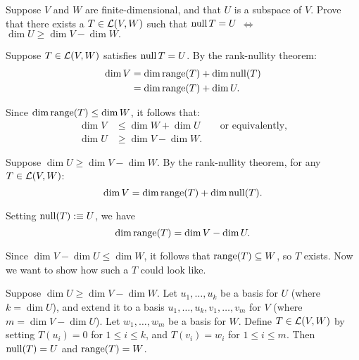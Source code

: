 \begin{xrcs}
  Suppose $V$ and $W$ are finite-dimensional, and that $U$ is a subspace of $V$. Prove that there exists a $T \in \mathcal{L}(V,W)$ such that $\operatorname{null} T = U$
  $\iff$ $\dim U \geq \dim V - \dim W.$
\end{xrcs}
\begin{prf}
  \Rightarrowdirection Suppose $T \in \mathcal{L}(V,W)$ satisfies $\operatorname{null} T = U$. By the rank-nullity theorem:
  \begin{equation}
    \begin{aligned}
      \dim V &= \dim \operatorname{range}(T) + \dim \operatorname{null}(T) \\
             &= \dim \operatorname{range}(T) + \dim U.
    \end{aligned}
  \end{equation}

  Since $\dim \operatorname{range}(T) \leq \dim W$, it follows that:
  \begin{equation}
    \begin{aligned}
      \dim V &\leq \dim W + \dim U \qquad \text{or equivalently,}  \\
      \dim U &\geq \dim V - \dim W.
    \end{aligned}
  \end{equation}

  \Leftarrowdirection Suppose $\dim U \geq \dim V - \dim W$. By the rank-nullity theorem, for any $T \in \mathcal{L}(V,W)$:
  \begin{equation}
    \dim V = \dim \operatorname{range}(T) + \dim \operatorname{null}(T).
  \end{equation}

  Setting $\operatorname{null}(T) :\equiv U$, we have
  \begin{equation}
    \dim \operatorname{range}(T) = \dim V - \dim U.
  \end{equation}

  Since $\dim V - \dim U \leq \dim W$, it follows that $\operatorname{range}(T) \subseteq W$, so $T$ exists. Now we want to show how such a $T$ could look like.

  Suppose $\dim U \geq \dim V - \dim W$. Let $u_1, \dots, u_k$ be a basis for $U$ (where $k = \dim U$), and extend it to a basis $u_1, \dots, u_k, v_1, \dots, v_m$ for $V$ (where $m = \dim V - \dim U$). Let $w_1, \dots, w_m$ be a basis for $W$. Define $T \in \mathcal{L}(V,W)$ by setting $T(u_i) = 0$ for $1 \leq i \leq k$, and $T(v_i) = w_i$ for $1 \leq i \leq m$. Then $\operatorname{null}(T) = U$ and $\operatorname{range}(T) = W$.
\end{prf}

